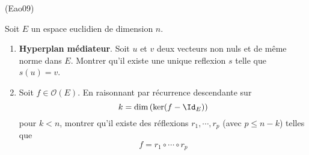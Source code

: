\begin{tiny}(Eao09)\end{tiny} Soit $E$ un espace euclidien de dimension $n$.
\begin{enumerate}
 \item \textbf{Hyperplan médiateur}. 
Soit $u$ et $v$ deux vecteurs non nuls et de même norme dans $E$. Montrer qu'il existe une unique reflexion $s$ telle que $s(u)=v$. 
\item Soit $f\in\mathcal O(E)$. En raisonnant par récurrence descendante sur
\begin{displaymath}
 k=\dim\left( \ker(f-\Id_E)\right) 
\end{displaymath}
pour $k<n$, montrer qu'il existe des réflexions $r_1,\cdots,r_p$ (avec $p\leq n-k$) telles que 
\begin{displaymath}
 f = r_1\circ\cdots \circ r_p
\end{displaymath}
\end{enumerate}